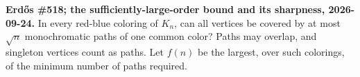 \textbf{Erd\H{o}s \#518; the sufficiently-large-order bound and its sharpness, 2026-09-24.}
In every red-blue coloring of $K_n$, can all vertices be covered by at most $\sqrt n$ monochromatic paths of one common color? Paths may overlap, and singleton vertices count as paths. Let $f(n)$ be the largest, over such colorings, of the minimum number of paths required.
